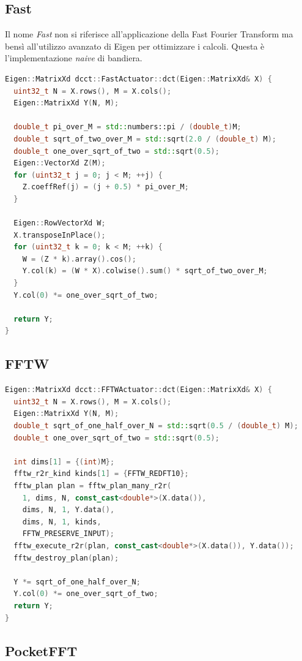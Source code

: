 \documentclass[a4paper,11pt,oneside, table]{article}
\begin{document}
\subsection{Fast}

Il nome \textit{Fast} non si riferisce all'applicazione della Fast Fourier Transform ma bens\`i all'utilizzo avanzato di Eigen per ottimizzare i calcoli.
Questa \`e l'implementazione \textit{naive} di bandiera.

\begin{lstlisting}[language=C++]
Eigen::MatrixXd dcct::FastActuator::dct(Eigen::MatrixXd& X) {
  uint32_t N = X.rows(), M = X.cols();
  Eigen::MatrixXd Y(N, M);

  double_t pi_over_M = std::numbers::pi / (double_t)M;
  double_t sqrt_of_two_over_M = std::sqrt(2.0 / (double_t) M);
  double_t one_over_sqrt_of_two = std::sqrt(0.5);
  Eigen::VectorXd Z(M);
  for (uint32_t j = 0; j < M; ++j) {
    Z.coeffRef(j) = (j + 0.5) * pi_over_M;
  }

  Eigen::RowVectorXd W;
  X.transposeInPlace();
  for (uint32_t k = 0; k < M; ++k) {
    W = (Z * k).array().cos();
    Y.col(k) = (W * X).colwise().sum() * sqrt_of_two_over_M;
  }
  Y.col(0) *= one_over_sqrt_of_two;

  return Y;
}
\end{lstlisting}

\subsection{FFTW}

\begin{lstlisting}[language=C++]
Eigen::MatrixXd dcct::FFTWActuator::dct(Eigen::MatrixXd& X) {
  uint32_t N = X.rows(), M = X.cols();
  Eigen::MatrixXd Y(N, M);
  double_t sqrt_of_one_half_over_N = std::sqrt(0.5 / (double_t) M);
  double_t one_over_sqrt_of_two = std::sqrt(0.5);

  int dims[1] = {(int)M}; 
  fftw_r2r_kind kinds[1] = {FFTW_REDFT10};
  fftw_plan plan = fftw_plan_many_r2r(
    1, dims, N, const_cast<double*>(X.data()),
    dims, N, 1, Y.data(),
    dims, N, 1, kinds,
    FFTW_PRESERVE_INPUT);
  fftw_execute_r2r(plan, const_cast<double*>(X.data()), Y.data());
  fftw_destroy_plan(plan);

  Y *= sqrt_of_one_half_over_N;
  Y.col(0) *= one_over_sqrt_of_two;
  return Y;
}
\end{lstlisting}

\subsection{PocketFFT}
\end{document}
